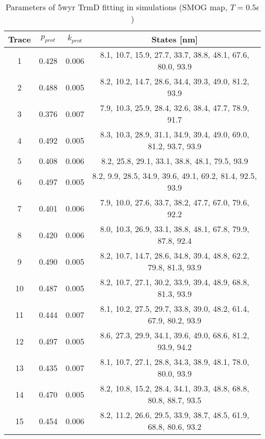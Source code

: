 \begin{table}
    \tiny
    \centering
    \caption{Parameters of 5wyr TrmD fitting in simulations (SMOG map, $T=0.5\epsilon$)}
    \label{tab:5wyr-sa-parameters}
    \begin{tabular}{c|c|c|c}
        \textbf{Trace} & \textbf{$p_{prot}$} & \textbf{$k_{prot}$} & \textbf{States [nm]}\\\hline
        1 & 0.428 & 0.006 & 8.1, 10.7, 15.9, 27.7, 33.7, 38.8, 48.1, 67.6, 80.0, 93.9\\
        2 & 0.488 & 0.005 & 8.2, 10.2, 14.7, 28.6, 34.4, 39.3, 49.0, 81.2, 93.9\\
        3 & 0.376 & 0.007 & 7.9, 10.3, 25.9, 28.4, 32.6, 38.4, 47.7, 78.9, 91.7\\
        4 & 0.492 & 0.005 & 8.3, 10.3, 28.9, 31.1, 34.9, 39.4, 49.0, 69.0, 81.2, 93.7, 93.9\\
        5 & 0.408 & 0.006 & 8.2, 25.8, 29.1, 33.1, 38.8, 48.1, 79.5, 93.9\\
        6 & 0.497 & 0.005 & 8.2, 9.9, 28.5, 34.9, 39.6, 49.1, 69.2, 81.4, 92.5, 93.9\\
        7 & 0.401 & 0.006 & 7.9, 10.0, 27.6, 33.7, 38.2, 47.7, 67.0, 79.6, 92.2\\
        8 & 0.420 & 0.006 & 8.0, 10.3, 26.9, 33.1, 38.8, 48.1, 67.8, 79.9, 87.8, 92.4\\
        9 & 0.490 & 0.005 & 8.2, 10.7, 14.7, 28.6, 34.8, 39.4, 48.8, 62.2, 79.8, 81.3, 93.9\\
        10 & 0.487 & 0.005 & 8.2, 10.7, 27.1, 30.2, 33.9, 39.4, 48.9, 68.8, 81.3, 93.9\\
        11 & 0.444 & 0.007 & 8.1, 10.2, 27.5, 29.7, 33.8, 39.0, 48.2, 61.4, 67.9, 80.2, 93.9\\
        12 & 0.497 & 0.005 & 8.6, 27.3, 29.9, 34.1, 39.6, 49.0, 68.6, 81.2, 93.9, 94.2\\
        13 & 0.435 & 0.007 & 8.1, 10.7, 27.1, 28.8, 34.3, 38.9, 48.1, 78.0, 80.0, 93.9\\
        14 & 0.470 & 0.005 & 8.2, 10.8, 15.2, 28.4, 34.1, 39.3, 48.8, 68.8, 80.8, 88.7, 93.5\\
        15 & 0.454 & 0.006 & 8.2, 11.2, 26.6, 29.5, 33.9, 38.7, 48.5, 61.9, 68.8, 80.6, 93.2\\
    \end{tabular}
\end{table}

